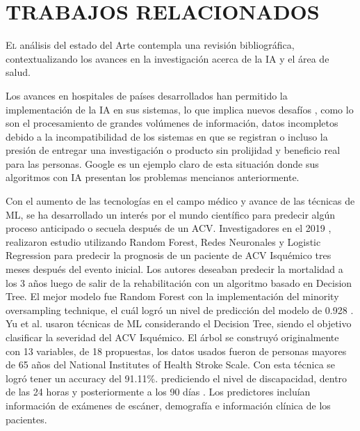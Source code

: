 \doublespacing
\chapter{TRABAJOS RELACIONADOS}
\label{sec:trabajos relacionados}
\lettrine[lines=4, slope=0.2em, findent=0.2em, nindent=0.6em]{E}{l}  análisis del estado del Arte contempla una revisión bibliográfica, contextualizando los avances en la investigación acerca de la IA y el área de salud.\\

\par Los avances en hospitales de países desarrollados han permitido la implementación de la IA en sus sistemas, lo que implica nuevos desafíos , como lo son el procesamiento de grandes volúmenes de información,  datos incompletos debido a la incompatibilidad de los sistemas en que se registran o incluso la presión de entregar una investigación o producto sin prolijidad y beneficio real para las personas. \cite{Nagendran2020} Google es un ejemplo claro de esta situación donde  sus algoritmos con IA presentan los problemas mencianos anteriormente.\\

\par Con el aumento de las tecnologías en el campo médico y avance de las técnicas de ML, se ha desarrollado un interés por el mundo científico para predecir algún proceso anticipado o secuela después de un ACV. Investigadores en el 2019 \cite{Heo2019}, realizaron estudio utilizando Random Forest, Redes Neuronales y Logistic Regression para predecir la prognosis de un paciente de ACV Isquémico tres meses después del evento inicial. Los autores deseaban predecir la mortalidad a los 3 años luego de salir de la rehabilitación con un algoritmo basado en Decision Tree. El mejor modelo fue Random Forest con la implementación del minority oversampling technique, el cuál logró un nivel de predicción del modelo de 0.928  \cite{Scrutinio2020}. Yu et al. \cite{Yu2020} usaron técnicas de ML considerando el Decision Tree, siendo el objetivo clasificar la severidad del ACV Isquémico. El árbol se construyó originalmente con 13 variables, de 18 propuestas, los datos usados fueron de personas mayores de 65 años del National Institutes of Health Stroke Scale. Con esta técnica se logró tener un accuracy del 91.11\%. prediciendo el nivel de discapacidad, dentro de las 24 horas  y posteriormente a los 90 días  \cite{Xie2018}. Los predictores incluían información de exámenes de escáner, demografía e información clínica de los pacientes.\\

